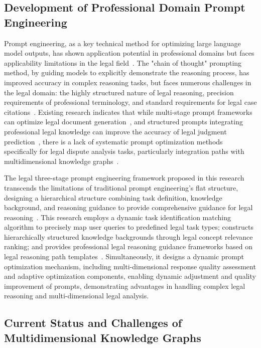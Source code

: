 \documentclass{article}
\theoremstyle{plain}
\theoremstyle{definition}
\begin{document}
\subsection{Development of Professional Domain Prompt Engineering}
\label{sec2.2}

Prompt engineering, as a key technical method for optimizing large language model outputs, has shown application potential in professional domains but faces applicability limitations in the legal field~\cite{Chen2023,Wei2022}. The "chain of thought" prompting method, by guiding models to explicitly demonstrate the reasoning process, has improved accuracy in complex reasoning tasks, but faces numerous challenges in the legal domain: the highly structured nature of legal reasoning, precision requirements of professional terminology, and standard requirements for legal case citations~\cite{Zhang2023b}. Existing research indicates that while multi-stage prompt frameworks can optimize legal document generation~\cite{Cheng2023}, and structured prompts integrating professional legal knowledge can improve the accuracy of legal judgment prediction~\cite{Zhang2023KL}, there is a lack of systematic prompt optimization methods specifically for legal dispute analysis tasks, particularly integration paths with multidimensional knowledge graphs~\cite{Wang2024a}.

The legal three-stage prompt engineering framework proposed in this research transcends the limitations of traditional prompt engineering's flat structure, designing a hierarchical structure combining task definition, knowledge background, and reasoning guidance to provide comprehensive guidance for legal reasoning~\cite{Trautmann2022}. This research employs a dynamic task identification matching algorithm to precisely map user queries to predefined legal task types; constructs hierarchically structured knowledge backgrounds through legal concept relevance ranking; and provides professional legal reasoning guidance frameworks based on legal reasoning path templates~\cite{Cui2023}. Simultaneously, it designs a dynamic prompt optimization mechanism, including multi-dimensional response quality assessment and adaptive optimization components, enabling dynamic adjustment and quality improvement of prompts, demonstrating advantages in handling complex legal reasoning and multi-dimensional legal analysis.

\subsection{Current Status and Challenges of Multidimensional Knowledge Graphs}
\label{sec2.3}
\end{document}
